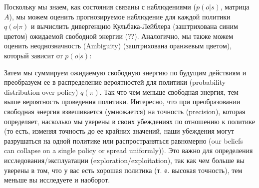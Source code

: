 \documentclass[twoside,leqno, 11pt]{article}
\begin{document}
	Поскольку мы знаем, как состояния связаны с наблюдениями ($p(o|s)$, матрица $A$), мы можем оценить прогнозируемое наблюдение для каждой политики $q(o|\pi)$ и вычислить дивергенцию Кульбака-Лейблера (заштрихована синим цветом) ожидаемой свободной энергии (??). Аналогично, мы также можем оценить неоднозначность (Ambiguity) (заштрихована оранжевым цветом), который зависит от $p(o|s)$:
	
	\begin{figure}[h]
	\end{figure}
	
	
	Затем мы суммируем ожидаемую свободную энергию по будущим действиям и преобразуем ее в распределение вероятностей для политики (probability distribution over policy) $q(\pi)$. Так что чем меньше свободная энергия, тем выше вероятность проведения политики. Интересно, что при преобразовании свободная энергия взвешивается (умножается) на точность (precision), которая определяет, насколько мы уверены в своих убеждениях по отношению к политике (то есть, изменяя точность до ее крайних значений, наши убеждения могут разрушаться на одной политике или распространяться равномерно (our beliefs can collapse on a single policy or spread uniformly)). Это важно для определения исследования/эксплуатации (exploration/exploitation), так как чем больше вы уверены в том, что у вас есть хорошая политика (т. е. высокая точность), тем меньше вы исследуете и наоборот.
	
	\begin{figure}[h]
	\end{figure}
	
\end{document}
